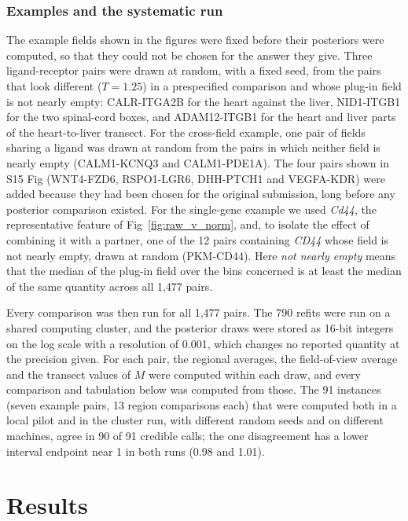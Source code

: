 \documentclass[10pt,letterpaper]{article}
\begin{document}
\subsubsection*{Examples and the systematic run}

The example fields shown in the figures were fixed before their posteriors were computed, so that they could not be chosen for the answer they give. Three ligand-receptor pairs were drawn at random, with a fixed seed, from the pairs that look different ($T = 1.25$) in a prespecified comparison and whose plug-in field is not nearly empty: CALR-ITGA2B for the heart against the liver, NID1-ITGB1 for the two spinal-cord boxes, and ADAM12-ITGB1 for the heart and liver parts of the heart-to-liver transect. For the cross-field example, one pair of fields sharing a ligand was drawn at random from the pairs in which neither field is nearly empty (CALM1-KCNQ3 and CALM1-PDE1A). The four pairs shown in S15 Fig (WNT4-FZD6, RSPO1-LGR6, DHH-PTCH1 and VEGFA-KDR) were added because they had been chosen for the original submission, long before any posterior comparison existed. For the single-gene example we used \textit{Cd44}, the representative feature of Fig~\ref{fig:raw_v_norm}, and, to isolate the effect of combining it with a partner, one of the 12 pairs containing \textit{CD44} whose field is not nearly empty, drawn at random (PKM-CD44). Here \textit{not nearly empty} means that the median of the plug-in field over the bins concerned is at least the median of the same quantity across all 1,477 pairs.

Every comparison was then run for all 1,477 pairs. The 790 refits were run on a shared computing cluster, and the posterior draws were stored as 16-bit integers on the log scale with a resolution of 0.001, which changes no reported quantity at the precision given. For each pair, the regional averages, the field-of-view average and the transect values of $M$ were computed within each draw, and every comparison and tabulation below was computed from those. The 91 instances (seven example pairs, 13 region comparisons each) that were computed both in a local pilot and in the cluster run, with different random seeds and on different machines, agree in 90 of 91 credible calls; the one disagreement has a lower interval endpoint near 1 in both runs (0.98 and 1.01).

\section*{Results}
\end{document}
